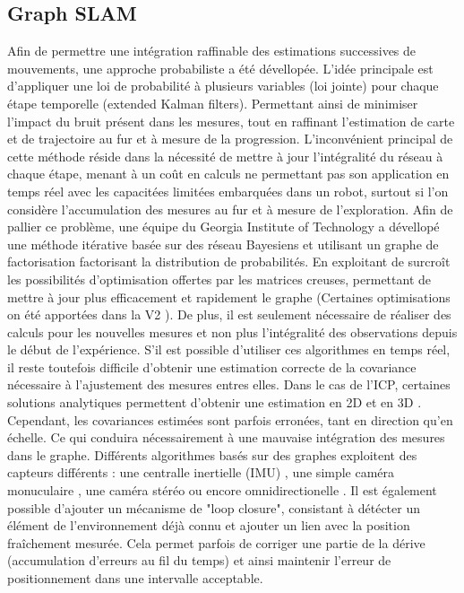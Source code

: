 \documentclass[twoside,twocolumn]{article}
\begin{document}
\subsection{Graph SLAM}
Afin de permettre une intégration raffinable des estimations successives de mouvements, une approche probabiliste a été dévellopée. L'idée principale est d'appliquer une loi de probabilité à plusieurs variables (loi jointe) pour chaque étape temporelle (extended Kalman filters)\cite{arulampalam_tutorial_2002}. Permettant ainsi de minimiser l'impact du bruit présent dans les mesures, tout en raffinant l'estimation de carte et de trajectoire au fur et à mesure de la progression. L'inconvénient principal de cette méthode réside dans la nécessité de mettre à jour l'intégralité du réseau à chaque étape, menant à un coût en calculs ne permettant pas son application en temps réel avec les capacitées limitées embarquées dans un robot, surtout si l'on considère l'accumulation des mesures au fur et à mesure de l'exploration. Afin de pallier ce problème, une équipe du Georgia Institute of Technology a dévellopé une méthode itérative\cite{kaess_isam:_2008} basée sur des réseau Bayesiens et utilisant un graphe de factorisation factorisant la distribution de probabilités. En exploitant de surcroît les possibilités d'optimisation offertes
par les matrices creuses, permettant de mettre à jour plus efficacement et rapidement le graphe (Certaines optimisations on été apportées dans la V2 \cite{kaess_isam2:_2012}). De plus, il est seulement nécessaire de réaliser
des calculs pour les nouvelles mesures et non plus l'intégralité des observations depuis le début de l'expérience. S'il est possible d'utiliser ces algorithmes en temps réel, il reste toutefois difficile d'obtenir une estimation correcte de la covariance nécessaire à l'ajustement des mesures entres elles. Dans le cas de l'ICP, certaines solutions analytiques permettent d'obtenir une estimation en 2D \cite{censi_accurate_2007} et en 3D \cite{prakhya_closed-form_2015}. Cependant, les covariances estimées sont parfois erronées, tant en direction qu'en échelle. Ce qui conduira nécessairement à une mauvaise intégration des mesures dans le graphe.
Différents algorithmes basés sur des graphes exploitent des capteurs différents : une centralle inertielle (IMU) \cite{robertson_simultaneous_2009}, une simple caméra monuculaire
\cite{mur-artal_orb-slam:_2015}\cite{engel_lsd-slam:_2014},
une caméra stéréo \cite{engel_large-scale_2015} ou encore omnidirectionelle \cite{caruso_large-scale_2015}. Il est également possible d'ajouter un mécanisme de "loop closure", consistant à détécter un élément de l'environnement
déjà connu et ajouter un lien avec la position fraîchement mesurée. Cela permet parfois de corriger une partie de la dérive (accumulation d'erreurs au fil du temps) et ainsi maintenir l'erreur de positionnement dans une intervalle acceptable.
\end{document}
